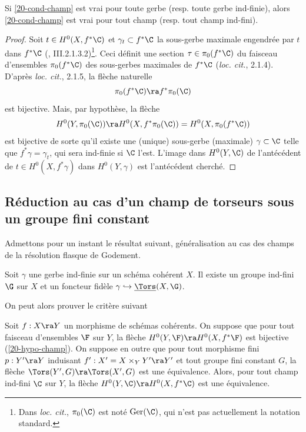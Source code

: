 \documentclass[10pt]{../fichiers-configuration-latex/smfart}
\begin{document}
\begin{lemme2}\label{20-red-gerb} Si \ref{20-cond-champ} est vrai pour toute gerbe (resp. toute
gerbe ind-finie), alors \ref{20-cond-champ} est vrai pour tout champ (resp. tout champ
ind-fini).\end{lemme2}

\begin{proof} Soit $t\in H^0(X,f^*\C)$ et $\gamma_t\subset f^*\C$ la sous-gerbe maximale engendrée
par $t$ dans $f^*\C$ (\cite{CNA@Giraud}, III.2.1.3.2)\footnote{Dans \textit{loc. cit.}, $\pi_0(\C)$
est noté $\mathrm{Ger}(\C)$, qui n'est pas actuellement la notation standard.}.  Ceci définit une
section $\tau\in\pi_0(f^*\C)$ du faisceau d'ensembles $\pi_0(f^*\C)$ des sous-gerbes maximales de
$f^*\C$ (\textit{loc. cit.}, 2.1.4). D'après \textit{loc. cit.}, 2.1.5, la flèche naturelle
$$\pi_0(f^*\C)\ra f^*\pi_0(\C)$$ est bijective. Mais, par hypothèse, la flèche $$H^0(Y,\pi_0(\C))\ra
H^0(X,f^*\pi_0(\C))=H^0(X,\pi_0(f^*\C))$$ est bijective de sorte qu'il existe une (unique)
sous-gerbe (maximale) $\gamma\subset\C$ telle que $f^*\gamma=\gamma_t$, qui sera ind-finie si $\C$
l'est.  L'image dans $H^0(Y,\C)$ de l'antécédent de $t\in H^0(X,f^*\gamma)$ dans $H^0(Y,\gamma)$ est
l'antécédent cherché.\end{proof}

\subsection{Réduction au cas d'un champ de torseurs sous un groupe fini constant} Admettons pour un
instant le résultat suivant, généralisation au cas des champs de la résolution flasque de Godement.

\begin{lemme2}\label{20-lemme-efface} Soit $\gamma$ une gerbe ind-finie sur un
schéma cohérent $X$. Il existe un groupe ind-fini $\G$ sur $X$ et un foncteur fidèle
$\gamma\hookrightarrow \underline{\Tors}(X,\G)$.\end{lemme2}

On peut alors prouver le critère suivant

\begin{proposition2}\label{20-prop-red-champ} Soit $f:X\ra Y$ un morphisme de schémas cohérents.  On
suppose que pour tout faisceau d'ensembles $\F$ sur $Y$, la flèche $H^0(Y,\F)\ra H^0(X,f^*\F)$ est
bijective (\ref{20-hypo-champ}).  On suppose en outre  que pour tout morphisme fini $p:Y'\ra Y$
induisant $f':X'=X\times_Y Y'\ra Y'$ et tout groupe fini constant $G$, la flèche
$\Tors(Y',G)\ra\Tors(X',G)$ est une équivalence.  Alors, pour tout champ ind-fini $\C$ sur $Y$, la
flèche $H^0(Y,\C)\ra H^0(X,f^*\C)$ est une équivalence.\end{proposition2}
\end{document}
